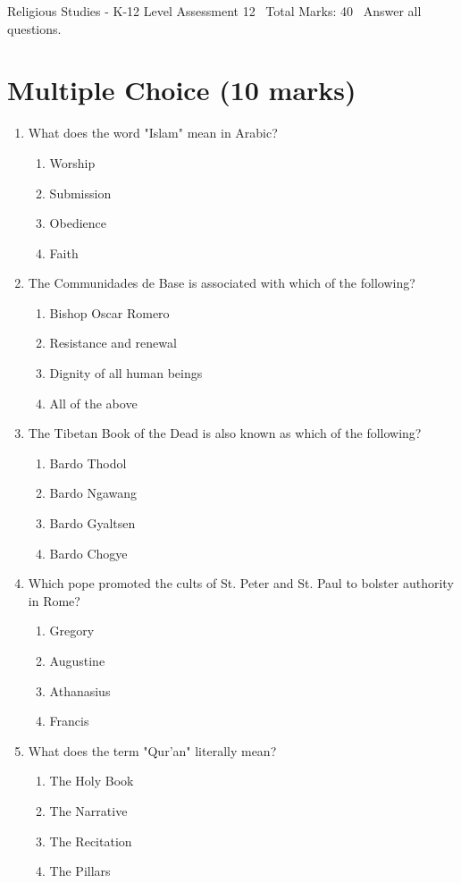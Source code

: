 \documentclass[12pt]{article}
\begin{document}
\begin{center}
Religious Studies - K-12 Level Assessment 12 \
Total Marks: 40 \
Answer all questions.
\end{center}

\section*{Multiple Choice (10 marks)}
\begin{enumerate}[label=\arabic*.]
\item What does the word "Islam" mean in Arabic?
\begin{enumerate}[label=(\alph*)]
    \item Worship
    \item Submission
    \item Obedience
    \item Faith
\end{enumerate}
\item The Communidades de Base is associated with which of the following?
\begin{enumerate}[label=(\alph*)]
    \item Bishop Oscar Romero
    \item Resistance and renewal
    \item Dignity of all human beings
    \item All of the above
\end{enumerate}
\item The Tibetan Book of the Dead is also known as which of the following?
\begin{enumerate}[label=(\alph*)]
    \item Bardo Thodol
    \item Bardo Ngawang
    \item Bardo Gyaltsen
    \item Bardo Chogye
\end{enumerate}
\item Which pope promoted the cults of St. Peter and St. Paul to bolster authority in Rome?
\begin{enumerate}[label=(\alph*)]
    \item Gregory
    \item Augustine
    \item Athanasius
    \item Francis
\end{enumerate}
\item What does the term "Qur'an" literally mean?
\begin{enumerate}[label=(\alph*)]
    \item The Holy Book
    \item The Narrative
    \item The Recitation
    \item The Pillars
\end{enumerate}
\end{enumerate}
\end{document}
